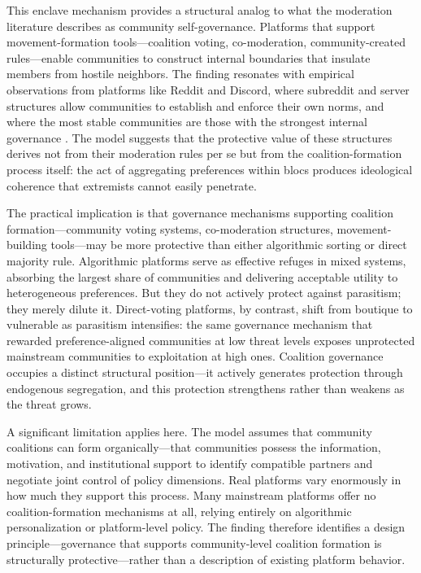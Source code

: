 \documentclass{article}
\begin{document}
This enclave mechanism provides a structural analog to what the moderation literature describes as community self-governance. Platforms that support movement-formation tools---coalition voting, co-moderation, community-created rules---enable communities to construct internal boundaries that insulate members from hostile neighbors. The finding resonates with empirical observations from platforms like Reddit and Discord, where subreddit and server structures allow communities to establish and enforce their own norms, and where the most stable communities are those with the strongest internal governance \citep{chandrasekharan2017you}. The model suggests that the protective value of these structures derives not from their moderation rules per se but from the coalition-formation process itself: the act of aggregating preferences within blocs produces ideological coherence that extremists cannot easily penetrate.

The practical implication is that governance mechanisms supporting coalition formation---community voting systems, co-moderation structures, movement-building tools---may be more protective than either algorithmic sorting or direct majority rule. Algorithmic platforms serve as effective refuges in mixed systems, absorbing the largest share of communities and delivering acceptable utility to heterogeneous preferences. But they do not actively protect against parasitism; they merely dilute it. Direct-voting platforms, by contrast, shift from boutique to vulnerable as parasitism intensifies: the same governance mechanism that rewarded preference-aligned communities at low threat levels exposes unprotected mainstream communities to exploitation at high ones. Coalition governance occupies a distinct structural position---it actively generates protection through endogenous segregation, and this protection strengthens rather than weakens as the threat grows.

A significant limitation applies here. The model assumes that community coalitions can form organically---that communities possess the information, motivation, and institutional support to identify compatible partners and negotiate joint control of policy dimensions. Real platforms vary enormously in how much they support this process. Many mainstream platforms offer no coalition-formation mechanisms at all, relying entirely on algorithmic personalization or platform-level policy. The finding therefore identifies a design principle---governance that supports community-level coalition formation is structurally protective---rather than a description of existing platform behavior.
\end{document}
